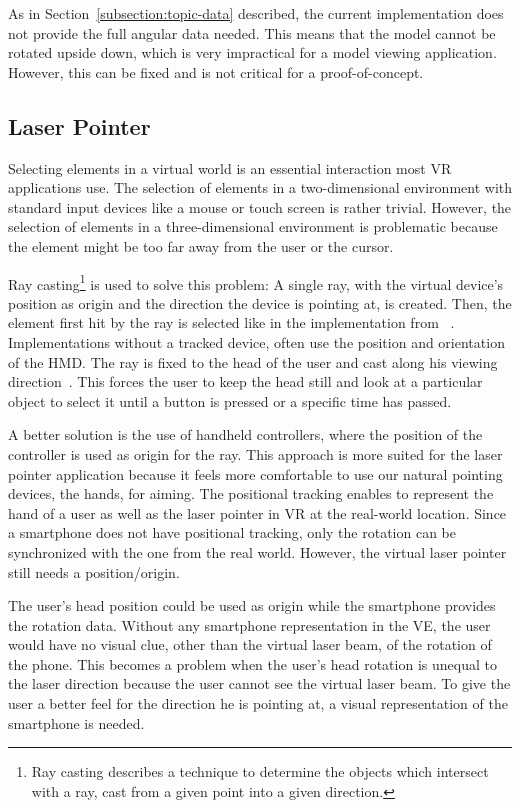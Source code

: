 As in Section~\ref{subsection:topic-data} described, the current implementation does not provide the full angular data needed. This means that the model cannot be rotated upside down, which is very impractical for a model viewing application. However, this can be fixed and is not critical for a proof-of-concept.


\subsection{Laser Pointer}\label{subsection:laser-pointer}

Selecting elements in a virtual world is an essential interaction most \gls{VR} applications use. The selection of elements in a two-dimensional environment with standard input devices like a mouse or touch screen is rather trivial. However, the selection of elements in a three-dimensional environment is problematic because the element might be too far away from the user or the cursor.

Ray casting\footnote{Ray casting describes a technique to determine the objects which intersect with a ray, cast from a given point into a given direction.} is used to solve this problem: A single ray, with the virtual device's position as origin and the direction the device is pointing at, is created. Then, the element first hit by the ray is selected like in the implementation from \citeauthor{Steed.2013}~\cite[46]{Steed.2013}. Implementations without a tracked device, often use the position and orientation of the \gls{HMD}. The ray is fixed to the head of the user and cast along his viewing direction~\cite[23]{Kamm.2018}. This forces the user to keep the head still and look at a particular object to select it until a button is pressed or a specific time has passed.

A better solution is the use of handheld controllers, where the position of the controller is used as origin for the ray. This approach is more suited for the laser pointer application because it feels more comfortable to use our natural pointing devices, the hands, for aiming. The positional tracking enables to represent the hand of a user as well as the laser pointer in \gls{VR} at the real-world location. Since a smartphone does not have positional tracking, only the rotation can be synchronized with the one from the real world. However, the virtual laser pointer still needs a position/origin.

The user's head position could be used as origin while the smartphone provides the rotation data. Without any smartphone representation in the \gls{VE}, the user would have no visual clue, other than the virtual laser beam, of the rotation of the phone. This becomes a problem when the user's head rotation is unequal to the laser direction because the user cannot see the virtual laser beam. To give the user a better feel for the direction he is pointing at, a visual representation of the smartphone is needed.

